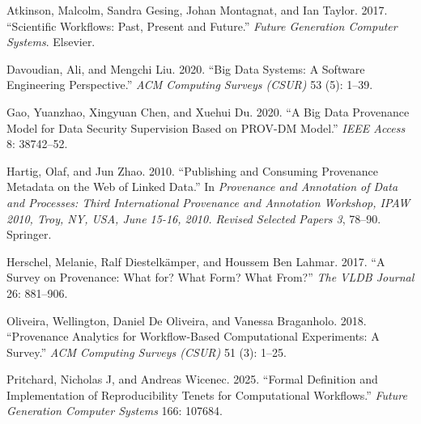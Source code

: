 \protect{}\label{refs}
\begin{CSLReferences}{1}{0}
Atkinson, Malcolm, Sandra Gesing, Johan Montagnat, and Ian Taylor. 2017.
{``Scientific Workflows: Past, Present and Future.''} \emph{Future
Generation Computer Systems}. Elsevier.

Davoudian, Ali, and Mengchi Liu. 2020. {``Big Data Systems: A Software
Engineering Perspective.''} \emph{ACM Computing Surveys (CSUR)} 53 (5):
1--39.

Gao, Yuanzhao, Xingyuan Chen, and Xuehui Du. 2020. {``A Big Data
Provenance Model for Data Security Supervision Based on PROV-DM
Model.''} \emph{IEEE Access} 8: 38742--52.

Hartig, Olaf, and Jun Zhao. 2010. {``Publishing and Consuming Provenance
Metadata on the Web of Linked Data.''} In \emph{Provenance and
Annotation of Data and Processes: Third International Provenance and
Annotation Workshop, IPAW 2010, Troy, NY, USA, June 15-16, 2010. Revised
Selected Papers 3}, 78--90. Springer.

Herschel, Melanie, Ralf Diestelkämper, and Houssem Ben Lahmar. 2017.
{``A Survey on Provenance: What for? What Form? What From?''} \emph{The
VLDB Journal} 26: 881--906.

Oliveira, Wellington, Daniel De Oliveira, and Vanessa Braganholo. 2018.
{``Provenance Analytics for Workflow-Based Computational Experiments: A
Survey.''} \emph{ACM Computing Surveys (CSUR)} 51 (3): 1--25.

Pritchard, Nicholas J, and Andreas Wicenec. 2025. {``Formal Definition
and Implementation of Reproducibility Tenets for Computational
Workflows.''} \emph{Future Generation Computer Systems} 166: 107684.

\end{CSLReferences}
